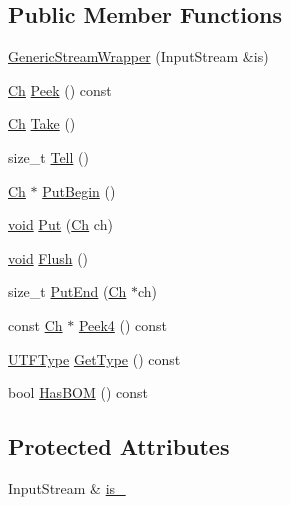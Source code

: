\subsection*{Public Member Functions}
\begin{DoxyCompactItemize}
\item 
\hyperlink{classGenericStreamWrapper_a7b12b1de6337d3f8e635b650e372c803}{Generic\+Stream\+Wrapper} (Input\+Stream \&is)
\item 
\hyperlink{classGenericStreamWrapper_aef9e89bc4997497315bde1b60e8bb848}{Ch} \hyperlink{classGenericStreamWrapper_a98d22642dfdd2626ee25ad1db9fe287e}{Peek} () const
\item 
\hyperlink{classGenericStreamWrapper_aef9e89bc4997497315bde1b60e8bb848}{Ch} \hyperlink{classGenericStreamWrapper_a1c0bc67a233e08ed89b4ff37455e7754}{Take} ()
\item 
size\+\_\+t \hyperlink{classGenericStreamWrapper_a5068a627e0a2deffa985db39f89c5378}{Tell} ()
\item 
\hyperlink{classGenericStreamWrapper_aef9e89bc4997497315bde1b60e8bb848}{Ch} $\ast$ \hyperlink{classGenericStreamWrapper_a4b35b8e9b6feba4d7f1d99ffce17f83d}{Put\+Begin} ()
\item 
\hyperlink{imgui__impl__opengl3__loader_8h_ac668e7cffd9e2e9cfee428b9b2f34fa7}{void} \hyperlink{classGenericStreamWrapper_a458b9f3e00ad41dadb069839ab53f0ba}{Put} (\hyperlink{classGenericStreamWrapper_aef9e89bc4997497315bde1b60e8bb848}{Ch} ch)
\item 
\hyperlink{imgui__impl__opengl3__loader_8h_ac668e7cffd9e2e9cfee428b9b2f34fa7}{void} \hyperlink{classGenericStreamWrapper_a210c0864fbff3cc72f2f62ed461105fb}{Flush} ()
\item 
size\+\_\+t \hyperlink{classGenericStreamWrapper_a84f8d6e1f95d53c4e8e22892d5113fd3}{Put\+End} (\hyperlink{classGenericStreamWrapper_aef9e89bc4997497315bde1b60e8bb848}{Ch} $\ast$ch)
\item 
const \hyperlink{classGenericStreamWrapper_aef9e89bc4997497315bde1b60e8bb848}{Ch} $\ast$ \hyperlink{classGenericStreamWrapper_af86225b2d81fec1ad7321546d5a8669a}{Peek4} () const
\item 
\hyperlink{encodings_8h_ac9448aedf514a5bb509bae73a9ce4e58}{U\+T\+F\+Type} \hyperlink{classGenericStreamWrapper_a5978422ff38fbacee201d4123da37e4f}{Get\+Type} () const
\item 
bool \hyperlink{classGenericStreamWrapper_a50f13a9be06f9b29032ca6c655b099ef}{Has\+B\+OM} () const
\end{DoxyCompactItemize}
\subsection*{Protected Attributes}
\begin{DoxyCompactItemize}
\item 
Input\+Stream \& \hyperlink{classGenericStreamWrapper_a2b44ae2c9460c2e18aca6ba25c537cc5}{is\+\_\+}
\end{DoxyCompactItemize}


